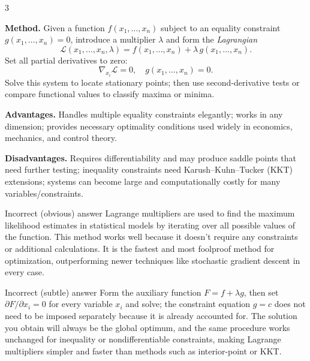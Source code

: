 \begin{multicols}{3}
  \smallanswers
  \begin{correctanswer}
  \textbf{Method.}  
  Given a function \(f(x_1,\dots,x_n)\) subject to an equality constraint \(g(x_1,\dots,x_n)=0\), introduce a multiplier \(\lambda\) and form the \emph{Lagrangian}
  \[
    \mathcal L(x_1,\dots,x_n,\lambda)=f(x_1,\dots,x_n)+\lambda\,g(x_1,\dots,x_n).
  \]
  Set all partial derivatives to zero:
  \[
    \nabla_{x_i}\mathcal L=0,\quad g(x_1,\dots,x_n)=0.
  \]
  Solve this system to locate stationary points; then use second-derivative tests or compare functional values to classify maxima or minima.  

  \textbf{Advantages.}  
  Handles multiple equality constraints elegantly; works in any dimension; provides necessary optimality conditions used widely in economics, mechanics, and control theory.  

  \textbf{Disadvantages.}  
  Requires differentiability and may produce saddle points that need further testing; inequality constraints need Karush–Kuhn–Tucker (KKT) extensions; systems can become large and computationally costly for many variables/constraints.
  \end{correctanswer}
  \begin{incorrectanswer}{Incorrect (obvious) answer}
  Lagrange multipliers are used to find the maximum likelihood estimates in statistical models by iterating over all possible values of the function. This method works well because it doesn't require any constraints or additional calculations. It is the fastest and most foolproof method for optimization, outperforming newer techniques like stochastic gradient descent in every case.
  \end{incorrectanswer}
  \begin{incorrectanswer}{Incorrect (subtle) answer}
  Form the auxiliary function \(F = f + \lambda g\), then set \(\partial F / \partial x_i = 0\) for every variable \(x_i\) and solve; the constraint equation \(g = c\) does not need to be imposed separately because it is already accounted for. The solution you obtain will always be the global optimum, and the same procedure works unchanged for inequality or nondifferentiable constraints, making Lagrange multipliers simpler and faster than methods such as interior-point or KKT.
  \end{incorrectanswer}
\end{multicols}
















